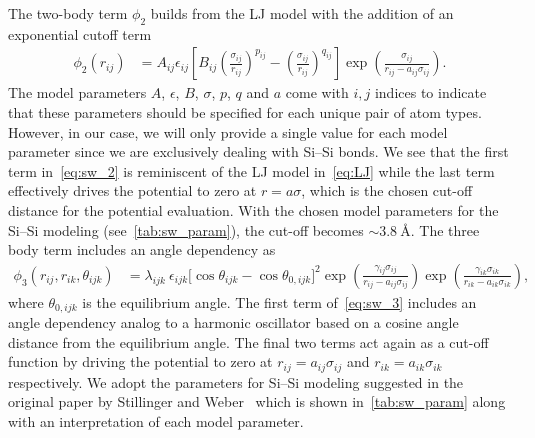 The two-body term $\phi_2$ builds from the \acrshort{LJ} model with the addition of an exponential cutoff term
\begin{align}
  \phi_2(r_{i j}) & =A_{ij} \epsilon_{ij}\left[B_{ij}\left(\frac{\sigma_{ij}}{r_{ij}}\right)^{p_{ij}} - \left(\frac{\sigma_{ij}}{r_{ij}}\right)^{q_{ij}}\right] \exp (\frac{\sigma_{ij}}{r_{ij}-a_{ij} \sigma_{ij}}).
  \label{eq:sw_2}
\end{align}
The model parameters $A$, $\epsilon$, $B$, $\sigma$, $p$, $q$ and $a$ come with
$i,j$ indices to indicate that these parameters should be specified for each
unique pair of atom types. However, in our case, we will only provide a single
value for each model parameter since we are exclusively dealing with Si--Si bonds. We see that the first term in~\cref{eq:sw_2} is reminiscent of the \acrshort{LJ} model in~\cref{eq:LJ} while the last term effectively drives the potential to zero at $r=a\sigma$, which is the chosen cut-off distance for the potential evaluation. With the chosen model parameters for the Si--Si modeling (see~\cref{tab:sw_param}), the cut-off becomes $\sim \SI{3.8}{\text{Å}}$. The three body term includes an angle dependency as
\begin{align}
  \phi_3(r_{ij}, r_{ik}, \theta_{ijk}) &= \lambda_{ijk} \ \epsilon_{ijk} \Big[\cos \theta_{ijk}-\cos \theta_{0,ijk}\Big]^2 \exp (\frac{\gamma_{ij} \sigma_{ij}}{r_{ij} - a_{ij} \sigma_{ij}}) \exp (\frac{\gamma_{ik} \sigma_{ik}}{r_{ik} - a_{ik} \sigma_{ik}}),
  \label{eq:sw_3}
\end{align}
where $\theta_{0,ijk}$ is the equilibrium angle. The first term of~\cref{eq:sw_3} includes an angle dependency analog to a harmonic oscillator
based on a cosine angle distance from the equilibrium angle. The final two terms
act again as a cut-off function by driving the potential to zero at $r_{ij} =
a_{ij}\sigma_{ij}$ and $r_{ik} = a_{ik}\sigma_{ik}$ respectively. We adopt the parameters for Si--Si modeling suggested in the original paper by Stillinger and Weber~\cite{PhysRevB.31.5262} which is shown in~\cref{tab:sw_param} along with an interpretation of each model parameter.



